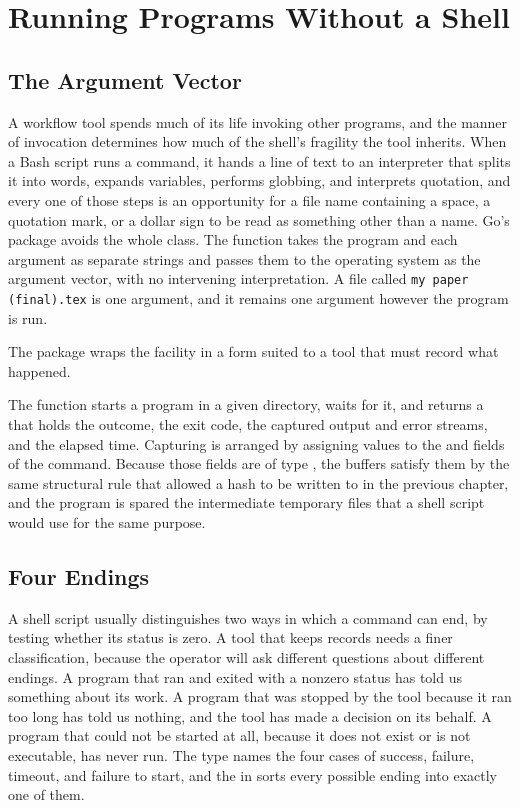 \chapter{Running Programs Without a Shell}
\label{ch:processes}

\section{The Argument Vector}

A workflow tool spends much of its life invoking other programs, and the manner of invocation determines how much of the shell's fragility the tool inherits. When a Bash script runs a command, it hands a line of text to an interpreter that splits it into words, expands variables, performs globbing, and interprets quotation, and every one of those steps is an opportunity for a file name containing a space, a quotation mark, or a dollar sign to be read as something other than a name. Go's  package avoids the whole class. The function  takes the program and each argument as separate strings and passes them to the operating system as the argument vector, with no intervening interpretation. A file called \texttt{my paper (final).tex} is one argument, and it remains one argument however the program is run.

The package  wraps the facility in a form suited to a tool that must record what happened.


The function  starts a program in a given directory, waits for it, and returns a  that holds the outcome, the exit code, the captured output and error streams, and the elapsed time. Capturing is arranged by assigning  values to the  and  fields of the command. Because those fields are of type , the buffers satisfy them by the same structural rule that allowed a hash to be written to in the previous chapter, and the program is spared the intermediate temporary files that a shell script would use for the same purpose.

\section{Four Endings}

A shell script usually distinguishes two ways in which a command can end, by testing whether its status  is zero. A tool that keeps records needs a finer classification, because the operator will ask different questions about different endings. A program that ran and exited with a nonzero status has told us something about its work. A program that was stopped by the tool because it ran too long has told us nothing, and the tool has made a decision on its behalf. A program that could not be started at all, because it does not exist or is not executable, has never run. The type  names the four cases of success, failure, timeout, and failure to start, and the  in  sorts every possible ending into exactly one of them.

